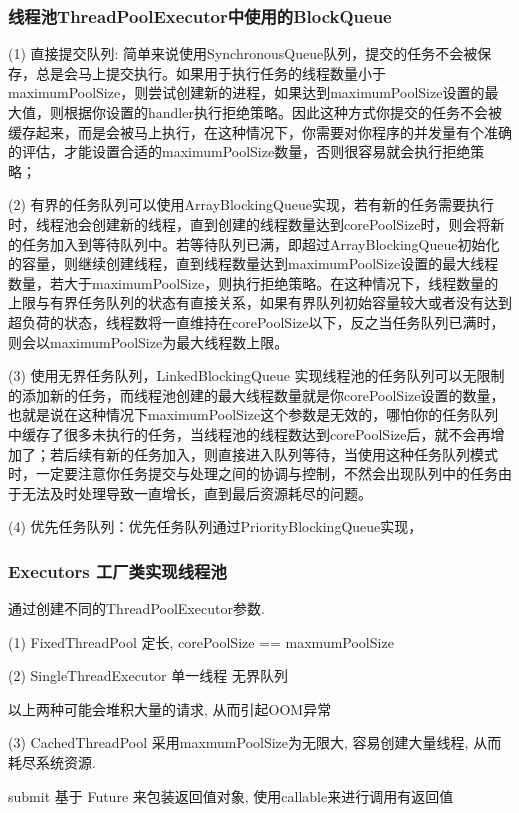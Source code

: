 \documentclass[UTF8]{ctexart}
\begin{document}
\subsubsection{线程池ThreadPoolExecutor中使用的BlockQueue}
(1) 直接提交队列: 简单来说使用SynchronousQueue队列，提交的任务不会被保存，总是会马上提交执行。如果用于执行任务的线程数量小于maximumPoolSize，则尝试创建新的进程，如果达到maximumPoolSize设置的最大值，则根据你设置的handler执行拒绝策略。因此这种方式你提交的任务不会被缓存起来，而是会被马上执行，在这种情况下，你需要对你程序的并发量有个准确的评估，才能设置合适的maximumPoolSize数量，否则很容易就会执行拒绝策略；\par
(2) 有界的任务队列可以使用ArrayBlockingQueue实现，若有新的任务需要执行时，线程池会创建新的线程，直到创建的线程数量达到corePoolSize时，则会将新的任务加入到等待队列中。若等待队列已满，即超过ArrayBlockingQueue初始化的容量，则继续创建线程，直到线程数量达到maximumPoolSize设置的最大线程数量，若大于maximumPoolSize，则执行拒绝策略。在这种情况下，线程数量的上限与有界任务队列的状态有直接关系，如果有界队列初始容量较大或者没有达到超负荷的状态，线程数将一直维持在corePoolSize以下，反之当任务队列已满时，则会以maximumPoolSize为最大线程数上限。\par
(3) 使用无界任务队列，LinkedBlockingQueue 实现线程池的任务队列可以无限制的添加新的任务，而线程池创建的最大线程数量就是你corePoolSize设置的数量，也就是说在这种情况下maximumPoolSize这个参数是无效的，哪怕你的任务队列中缓存了很多未执行的任务，当线程池的线程数达到corePoolSize后，就不会再增加了；若后续有新的任务加入，则直接进入队列等待，当使用这种任务队列模式时，一定要注意你任务提交与处理之间的协调与控制，不然会出现队列中的任务由于无法及时处理导致一直增长，直到最后资源耗尽的问题。 \par
(4) 优先任务队列：优先任务队列通过PriorityBlockingQueue实现，
\subsubsection{Executors 工厂类实现线程池}
通过创建不同的ThreadPoolExecutor参数.\par
(1) FixedThreadPool 定长, corePoolSize == maxmumPoolSize   \par
(2) SingleThreadExecutor 单一线程 无界队列 \par
以上两种可能会堆积大量的请求, 从而引起OOM异常 \par
(3) CachedThreadPool 采用maxmumPoolSize为无限大, 容易创建大量线程, 从而耗尽系统资源. \par

submit  基于  Future 来包装返回值对象, 使用callable来进行调用有返回值
\end{document}
